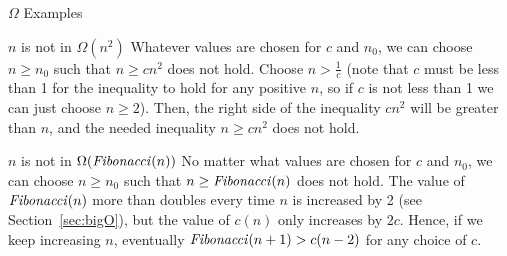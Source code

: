 \begin{schemeregion}
\begin{example}{$\Omega$ Examples}
\begin{descriptionlist}
\item[$n$ is not in $\Omega(n^2)$]\forcenl Whatever values are chosen for $c$ and $n_0$, we can choose $n \ge n_0$ such that $n \ge cn^2$ does not hold.  Choose $n > \frac{1}{c}$ (note that $c$ must be less than 1 for the inequality to hold for any positive $n$, so if $c$ is not less than 1 we can just choose $n \ge 2$).  Then, the right side of the inequality $cn^2$ will be greater than $n$, and the needed inequality $n \ge cn^2$ does not hold.
\item[$n$ is not in $\Omega(\textrm{\emph{Fibonacci}}(n))$] \forcenl No matter what values are chosen for $c$ and $n_0$, we can choose $n \ge n_0$ such that $n \ge \textrm{\emph{Fibonacci}}(n)$ does not hold.  The value of $\textrm{\emph{Fibonacci}}(n)$ more than doubles every time $n$ is increased by 2 (see Section~\ref{sec:bigO}), but the value of $c(n)$ only increases by $2c$.  Hence, if we keep increasing $n$, eventually $\textrm{\emph{Fibonacci}}(n+1) > c(n-2)$ for any choice of $c$.
\end{descriptionlist}
\end{example}



\end{schemeregion}
